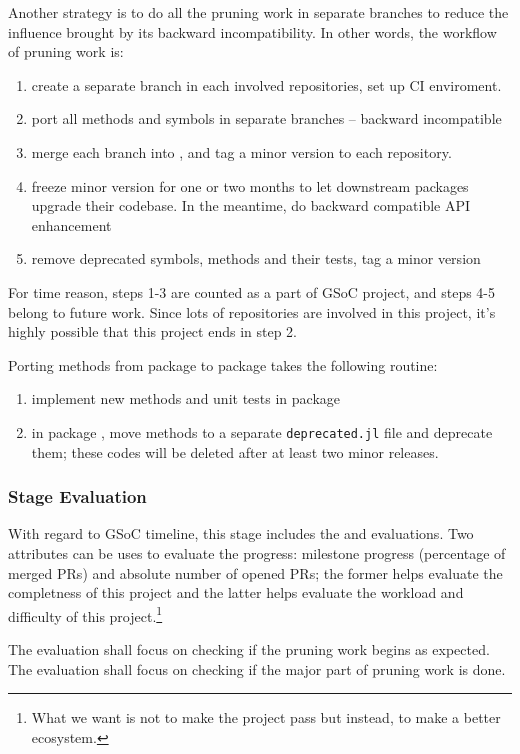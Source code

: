 \newcommand{\packageA}{package \sname{A}\xspace}
\newcommand{\packageB}{package \sname{B}\xspace}
Another strategy is to do all the pruning work in separate branches to reduce the influence brought by its backward incompatibility. In other words, the workflow of pruning work is:
\begin{enumerate}
    \item create a separate branch  in each involved repositories, set up CI enviroment.
    \item port all methods and symbols in separate branches -- backward incompatible
    \item merge each branch into , and tag a minor version to each repository.
    \item freeze minor version for one or two months to let downstream packages upgrade their codebase. In the meantime, do backward compatible API enhancement
    \item remove deprecated symbols, methods and their tests, tag a minor version
\end{enumerate}
For time reason, steps 1-3 are counted as a part of GSoC project, and steps 4-5 belong to future work. Since lots of repositories are involved in this project, it's highly possible that this project ends in step 2.\par

Porting methods from \packageA to \packageB takes the following routine:
\begin{enumerate}
    \item implement new methods and unit tests in \packageB
    \item in \packageA, move methods to a separate \texttt{deprecated.jl} file and deprecate them; these codes will be deleted after at least two minor releases.
\end{enumerate}

\subsubsection*{Stage Evaluation}

With regard to GSoC timeline, this stage includes the  and  evaluations. Two attributes can be uses to evaluate the progress: milestone progress (percentage of merged PRs) and absolute number of opened PRs; the former helps evaluate the completness of this project and the latter helps evaluate the workload and difficulty of this project.\footnote{What we want is not to make the project pass but instead, to make \images{} a better ecosystem.}

The  evaluation shall focus on checking if the pruning work begins as expected. The  evaluation shall focus on checking if the major part of pruning work is done.
